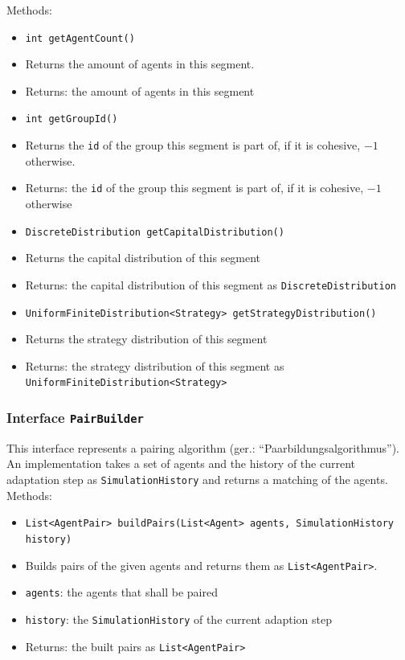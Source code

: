 \documentclass[parskip=full,11pt]{scrartcl}
\begin{document}
Methods:
\begin{itemize}\itemsep -10pt
\item \texttt{int getAgentCount()}
\item[] Returns the amount of agents in this segment.
\item[] Returns: the amount of agents in this segment

\item \texttt{int getGroupId()}
\item[] Returns the \texttt{id} of the group this segment is part of, if it is cohesive, \(-1\) otherwise.
\item[] Returns: the \texttt{id} of the group this segment is part of, if it is cohesive, \(-1\) otherwise

\item \texttt{DiscreteDistribution getCapitalDistribution()}
\item[] Returns the capital distribution of this segment
\item[] Returns: the capital distribution of this segment as \texttt{DiscreteDistribution}

\item \texttt{UniformFiniteDistribution<Strategy> getStrategyDistribution()}
\item[] Returns the strategy distribution of this segment
\item[] Returns: the strategy distribution of this segment as \texttt{UniformFiniteDistribution<Strategy>}
\end{itemize}

\subsubsection{Interface \texttt{PairBuilder}}
This interface represents a pairing algorithm (ger.: \enquote{Paarbildungsalgorithmus}). An implementation takes a set of agents and the history of the current adaptation step as \texttt{SimulationHistory} and returns a matching of the agents.
\newpage
Methods:
\begin{itemize}\itemsep -10pt
\item \texttt{List<AgentPair> buildPairs(List<Agent> agents, SimulationHistory history)}
\item[] Builds pairs of the given agents and returns them as \texttt{List<AgentPair>}.
\item[] \texttt{agents}: the agents that shall be paired
\item[] \texttt{history}: the \texttt{SimulationHistory} of the current adaption step
\item[] Returns: the built pairs as \texttt{List<AgentPair>}
\end{itemize}
\end{document}
